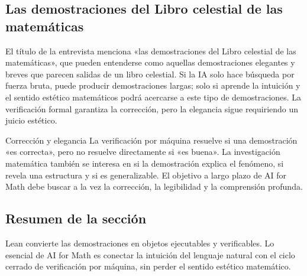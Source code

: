 \subsection{Las demostraciones del Libro celestial de las matemáticas}

El título de la entrevista menciona «las demostraciones del Libro celestial de las matemáticas», que pueden entenderse como aquellas demostraciones elegantes y breves que parecen salidas de un libro celestial. Si la IA solo hace búsqueda por fuerza bruta, puede producir demostraciones largas; solo si aprende la intuición y el sentido estético matemáticos podrá acercarse a este tipo de demostraciones. La verificación formal garantiza la corrección, pero la elegancia sigue requiriendo un juicio estético.

\begin{importantbox}{Corrección y elegancia}
La verificación por máquina resuelve si una demostración «es correcta», pero no resuelve directamente si «es buena». La investigación matemática también se interesa en si la demostración explica el fenómeno, si revela una estructura y si es generalizable. El objetivo a largo plazo de AI for Math debe buscar a la vez la corrección, la legibilidad y la comprensión profunda.
\end{importantbox}

\subsection{Resumen de la sección}

Lean convierte las demostraciones en objetos ejecutables y verificables. Lo esencial de AI for Math es conectar la intuición del lenguaje natural con el ciclo cerrado de verificación por máquina, sin perder el sentido estético matemático.
